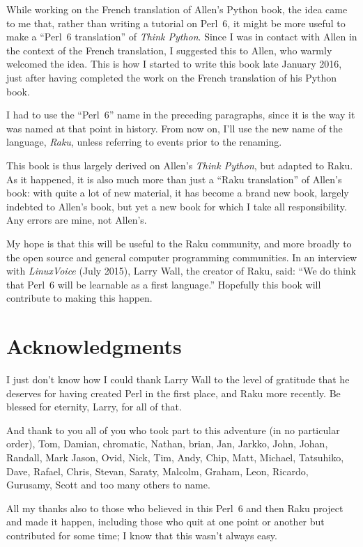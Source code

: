 While working on the French translation of Allen's Python book, 
the idea came to me that, rather than writing a tutorial on 
Perl~6, it might be more useful to make a ``Perl~6 translation'' 
of \emph{Think Python}. Since I was in contact with Allen in the context 
of the French translation, I suggested this to Allen, who 
warmly welcomed the idea. This is how I started to write this 
book late January 2016, just after having completed the 
work on the French translation of his Python book.

I had to use the ``Perl~6'' name in the preceding paragraphs, since 
it is the way it was named at that point in history. From now on, 
I'll use the new name of the language, \emph{Raku}, unless referring 
to events prior to the renaming.

This book is thus largely derived on Allen's \emph{Think Python}, 
but adapted to Raku. As it happened, it is also much more 
than just a ``Raku translation'' of Allen's book: with 
quite a lot of new material, it has become a brand new book, 
largely indebted to Allen's book, but yet a new book for which 
I take all responsibility. Any errors are mine, 
not Allen's.

My hope is that this will be useful to the Raku community, and 
more broadly to the open source and general 
computer programming communities. In an interview with 
\emph{LinuxVoice} (July 2015), Larry Wall, the creator of Raku, 
said: ``We do think that Perl~6 will be learnable as a first language.''
Hopefully this book will contribute to making this happen. 

\section*{Acknowledgments}

I just don't know how I could thank Larry Wall to the level of 
gratitude that he deserves for having created Perl in the first 
place, and Raku more recently. Be blessed for eternity, Larry, 
for all of that. 

And thank to you all of you who took part to this 
adventure (in no particular order), Tom, Damian, 
chromatic, Nathan, brian, Jan, Jarkko, John, Johan, Randall, 
Mark Jason, Ovid, Nick, Tim, Andy, Chip, Matt, Michael, Tatsuhiko, 
Dave, Rafael, Chris, Stevan, Saraty, Malcolm, Graham, Leon, 
Ricardo, Gurusamy, Scott and too many others to name.  

All my thanks also to those who believed in 
this Perl~6 and then Raku project and made it happen, including those who 
quit at one point or another but contributed for some 
time; I know that this wasn't always easy.

